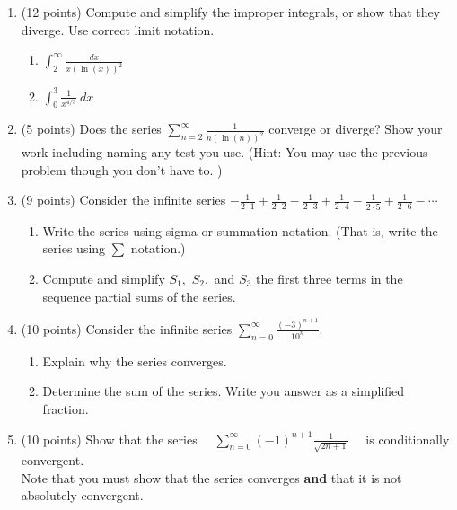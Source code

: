 \documentclass[12pt]{article}
\let\ds\displaystyle
\begin{document}
\newpage
\begin{enumerate}
\item (12 points) Compute and simplify the improper integrals, or show that they diverge. Use correct limit notation.
	\begin{enumerate}
	\item $\ds \int_2^\infty \frac{dx}{x(\ln(x))^2}$
	\vfill
	\item $\ds \int_0^3 \frac{1}{x^{4/3}}\: dx$
	\vfill
	\end{enumerate}

\item (5 points) Does the series $\ds \sum_{n=2}^\infty \frac{1}{n(\ln(n))^2}$  converge or diverge? Show your work including naming any test you use. (Hint: You may use the previous problem though you don't have to. )\\


\vfill

\newpage
\item (9 points) Consider the infinite series $-\frac{1}{2\cdot 1}+\frac{1}{2\cdot 2}-\frac{1}{2\cdot3}+\frac{1}{2\cdot 4}-\frac{1}{2\cdot 5}+\frac{1}{2 \cdot 6}-\cdots$
	\begin{enumerate}
	\item Write the series using sigma or summation notation. (That is, write the series using $\ds \sum $ notation.)
	\vfill
	\item  Compute and simplify $S_1,$ $S_2,$ and $S_3$ the first three terms in the sequence partial sums of the series.
	\vfill
	\end{enumerate}
\item (10 points) Consider the infinite series $\ds \sum_{n=0}^\infty \frac{(-3)^{n+1}}{10^{n}}.$
	\begin{enumerate}
	\item Explain why the series converges. 
	\vfill
	\item Determine the sum of the series. Write you answer as a simplified fraction.
	\vfill
	\end{enumerate}
\newpage
\item (10 points) Show that the series $\quad \ds \sum_{n=0}^\infty (-1)^{n+1}\frac{1}{\sqrt{2n+1}} \quad$ is conditionally convergent. \\

Note that you must show that the series converges \textbf{and} that it is not absolutely convergent. \\


\end{enumerate}
\end{document}
